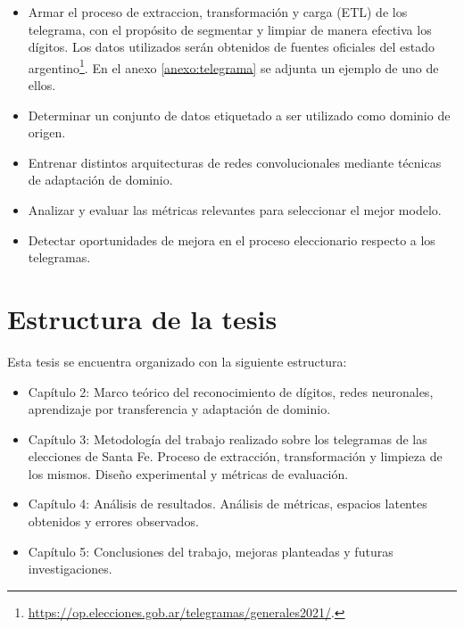 \begin{itemize}
    \item Armar el proceso de extraccion, transformación y carga (ETL) de los telegrama, con el propósito de segmentar y limpiar
          de manera efectiva los dígitos. Los datos utilizados serán obtenidos de fuentes oficiales del estado
          argentino\footnote{\href{https://op.elecciones.gob.ar/telegramas/generales2021/}{https://op.elecciones.gob.ar/telegramas/generales2021/}.}.
          En el anexo \ref{anexo:telegrama} se adjunta un ejemplo de uno de ellos.
    \item Determinar un conjunto de datos etiquetado a ser utilizado como dominio de origen.
    \item Entrenar distintos arquitecturas de redes convolucionales mediante técnicas de adaptación de dominio.
    \item Analizar y evaluar las métricas relevantes para seleccionar el mejor modelo.
    \item Detectar oportunidades de mejora en el proceso eleccionario respecto a los telegramas.
\end{itemize}

\section{Estructura de la tesis}

Esta tesis se encuentra organizado con la siguiente estructura:

\begin{itemize}
    \item Capítulo 2: Marco teórico del reconocimiento de dígitos, redes neuronales, aprendizaje por transferencia y adaptación
          de dominio.
    \item Capítulo 3: Metodología del trabajo realizado sobre los telegramas de las elecciones de Santa Fe. Proceso de
          extracción, transformación y limpieza de los mismos. Diseño experimental y métricas de evaluación.
    \item Capítulo 4: Análisis de resultados. Análisis de métricas, espacios latentes obtenidos y errores observados.
    \item Capítulo 5: Conclusiones del trabajo, mejoras planteadas y futuras investigaciones.
\end{itemize}